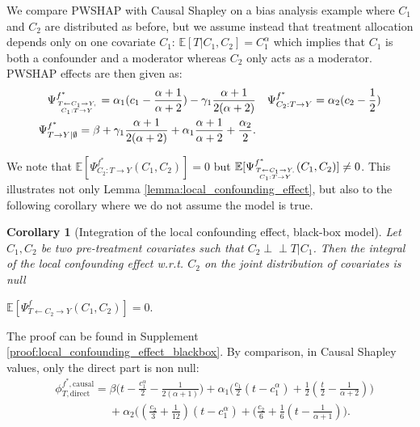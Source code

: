 \documentclass{article}
\theoremstyle{plain}
\newtheorem{corollary}[theorem]{Corollary}
\theoremstyle{definition}
\theoremstyle{remark}
\newcommand{\effect}{\Psi}
\theoremstyle{mystyle}
\newcommand{\indep}{\perp\!\!\!\!\perp}
\begin{document}
We compare PWSHAP with Causal Shapley on a bias analysis example where $C_1$ and $C_2$ are distributed as before, but we assume instead that treatment allocation depends only on one covariate $C_1$: $\mathbb{E}[T|C_1,C_2] = C_1^\alpha$ which implies that $C_1$ is both a confounder and a moderator whereas $C_2$ only acts as a moderator. PWSHAP effects are then given as:
\begin{align*}
\effect^{f^*}_{T \leftarrow C_1 \rightarrow Y, \atop C_1: T \rightarrow Y} = \alpha_1(c_1 - \frac{\alpha+1}{\alpha+2}) - \gamma_1\frac{\alpha+1}{2(\alpha+2)}             &  &\effect^{f^*}_{C_2: T \rightarrow Y} = \alpha_2(c_2 - \frac{1}{2})              \\
\effect^{f^*}_{T \rightarrow Y | \emptyset} = \beta + \gamma_1\frac{\alpha+1}{2(\alpha + 2)} + \alpha_1\frac{\alpha+1}{\alpha+2} + \frac{\alpha_2}{2}.          &  & 
\end{align*}

We note that $\mathbb{E}[\effect^{f^*}_{C_2: T \rightarrow Y}(C_1,C_2)] = 0$ but $\mathbb{E}[\effect^{f^*}_{T \leftarrow C_1 \rightarrow Y, \atop C_1: T \rightarrow Y}(C_1,C_2)] \neq 0$. This illustrates not only Lemma \ref{lemma:local_confounding_effect}, but also to the following corollary where we do not assume the model is true.

\begin{corollary}[Integration of the local confounding effect, black-box model] \label{cor:local_confounding_effect_blackbox}
 Let $C_1, C_2$ be two pre-treatment covariates such that $C_2 \indep T | C_1$. Then the integral of the local confounding effect w.r.t. $C_2$ on the joint distribution of covariates is null 
\centerline{ $ \mathbb{E}[\effect^f_{T \leftarrow C_2 \rightarrow Y}(C_1,C_2)] = 0.$ }
\end{corollary}
The proof can be found in Supplement \ref{proof:local_confounding_effect_blackbox}.
By comparison, in Causal Shapley values, only the direct part is non null: 
\begin{align*}
    &\phi^{f^*,\text{causal}}_{T,\text{direct}} = \beta \big(t - \frac{c_1^\alpha}{2} - \frac{1}{2(\alpha+1)} \big)
     + \alpha_1 \big(\frac{c_1}{2}(t - c_1^\alpha) +\frac{1}{2}( \frac{t}{2} - \frac{1}{\alpha+2}) \big) \\
     & \hspace{2cm} + \alpha_2 \big((\frac{c_2}{3} + \frac{1}{12})(t - c_1^\alpha) + (\frac{c_2}{6} + \frac{1}{6}(t - \frac{1}{\alpha+1}) \big). \\
\end{align*}
\end{document}

